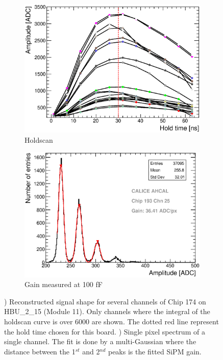 \begin{figure}[htbp!]
  \centering
  \begin{subfigure}[t]{0.49\textwidth}
    \includegraphics[width=1.\linewidth]{../Thesis_Plots/Commissioning/Plots/Holdscan_HBU2_15.eps}
    \caption{Holdscan} \label{fig:Holdscan}
  \end{subfigure}
  \hfill
  \begin{subfigure}[t]{0.49\textwidth}
    \includegraphics[width=1.\linewidth]{../Thesis_Plots/Commissioning/Plots/Gain100fF_MainzHBU4.eps}
    \caption{Gain measured at 100 fF} \label{fig:Gain100fF}
  \end{subfigure}
  \caption{) Reconstructed signal shape for several channels of Chip 174 on HBU\_{}2\_{}15 (Module 11). Only channels where the integral of the holdscan curve is over 6000 are shown. The dotted red line represent the hold time chosen for this board. ) Single pixel spectrum of a single channel. The fit is done by a multi-Gaussian where the distance between the 1$^{st}$ and 2$^{nd}$ peaks is the fitted SiPM gain.}
\end{figure}

